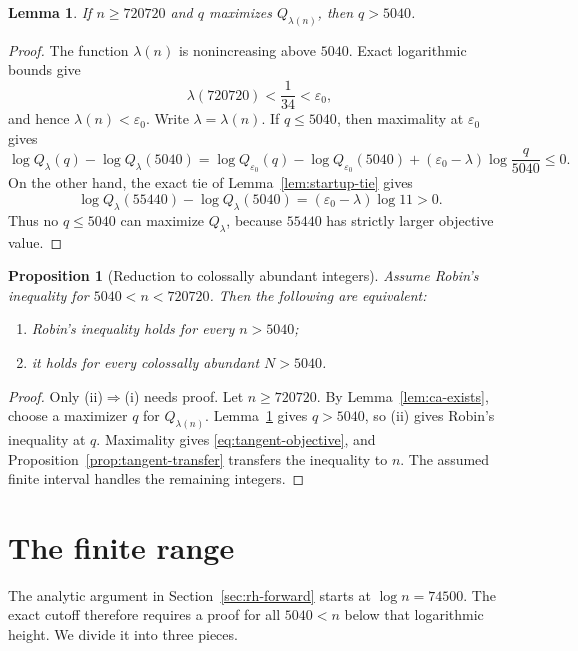 \documentclass[11pt]{amsart}
\newtheorem{proposition}[theorem]{Proposition}
\newtheorem{lemma}[theorem]{Lemma}
\theoremstyle{definition}
\theoremstyle{remark}
\numberwithin{equation}{section}
\newcommand{\eps}{\varepsilon}
\begin{document}
\begin{lemma}\label{lem:maximizer-above}
If $n\ge720720$ and $q$ maximizes $Q_{\lambda(n)}$, then $q>5040$.
\end{lemma}

\begin{proof}
The function $\lambda(n)$ is nonincreasing above $5040$.  Exact logarithmic
bounds give
\[
  \lambda(720720)<\frac1{34}<\eps_0,
\]
and hence $\lambda(n)<\eps_0$.  Write $\lambda=\lambda(n)$.  If
$q\le5040$, then maximality at $\eps_0$ gives
\[
 \log Q_\lambda(q)-\log Q_\lambda(5040)
 =\log Q_{\eps_0}(q)-\log Q_{\eps_0}(5040)
  +(\eps_0-\lambda)\log\frac q{5040}\le0.
\]
On the other hand, the exact tie of Lemma~\ref{lem:startup-tie} gives
\[
 \log Q_\lambda(55440)-\log Q_\lambda(5040)
   =(\eps_0-\lambda)\log 11>0.
\]
Thus no $q\le5040$ can maximize $Q_\lambda$, because $55440$ has strictly
larger objective value.
\end{proof}

\begin{proposition}[Reduction to colossally abundant integers]
\label{prop:ca-reduction}
Assume Robin's inequality for $5040<n<720720$.  Then the following are
equivalent:
\begin{enumerate}[label=(\roman*)]
  \item Robin's inequality holds for every $n>5040$;
  \item it holds for every colossally abundant $N>5040$.
\end{enumerate}
\end{proposition}

\begin{proof}
Only (ii)$\Rightarrow$(i) needs proof.  Let $n\ge720720$.  By
Lemma~\ref{lem:ca-exists}, choose a maximizer $q$ for
$Q_{\lambda(n)}$.  Lemma~\ref{lem:maximizer-above} gives $q>5040$, so (ii)
gives Robin's inequality at $q$.  Maximality gives
\eqref{eq:tangent-objective}, and Proposition~\ref{prop:tangent-transfer}
transfers the inequality to $n$.  The assumed finite interval handles the
remaining integers.
\end{proof}

\section{The finite range}\label{sec:finite}

The analytic argument in Section~\ref{sec:rh-forward} starts at
$\log n=74500$.  The exact cutoff therefore requires a proof for all
$5040<n$ below that logarithmic height.  We divide it into three pieces.
\end{document}
